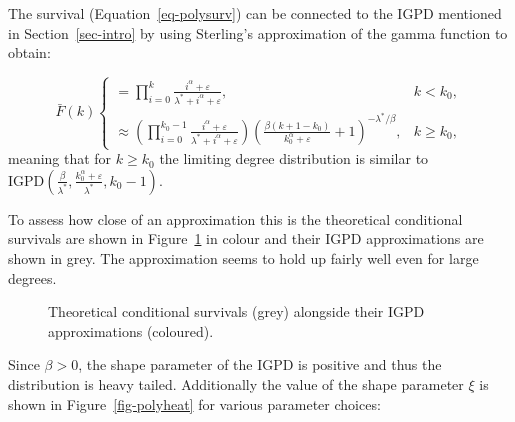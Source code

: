 \documentclass[
  sn-basic,
]{sn-jnl}
\theoremstyle{plain}
\theoremstyle{remark}
\begin{document}
The survival (Equation~\ref{eq-polysurv}) can be connected to the IGPD
mentioned in Section~\ref{sec-intro} by using Sterling's approximation
of the gamma function to obtain:

\[
\bar F(k) 
\begin{cases}
=\prod_{i=0}^{k}\frac{i^\alpha + \varepsilon}{\lambda^*+i^\alpha + \varepsilon},&k<k_0,\\
\approx \left(\prod_{i=0}^{k_0-1}\frac{i^\alpha + \varepsilon}{\lambda^*+i^\alpha + \varepsilon}\right) \left(\frac{\beta(k+1-k_0)}{k_0^{\alpha}+\varepsilon} + 1\right)^{-\lambda^*/\beta},&k\ge k_0,
\end{cases}
\] meaning that for \(k\ge k_0\) the limiting degree distribution is
similar to
\(\text{IGPD}\left(\frac{\beta}{\lambda^*}, \frac{k_0^\alpha + \varepsilon}{\lambda^*},k_0-1\right)\).

To assess how close of an approximation this is the theoretical
conditional survivals are shown in Figure~\ref{fig-approx_surv} in
colour and their IGPD approximations are shown in grey. The
approximation seems to hold up fairly well even for large degrees.

\begin{figure}[H]


\caption{\label{fig-approx_surv}Theoretical conditional survivals (grey)
alongside their IGPD approximations (coloured).}

\end{figure}%

Since \(\beta>0\), the shape parameter of the IGPD is positive and thus
the distribution is heavy tailed. Additionally the value of the shape
parameter \(\xi\) is shown in Figure~\ref{fig-polyheat} for various
parameter choices:
\end{document}
